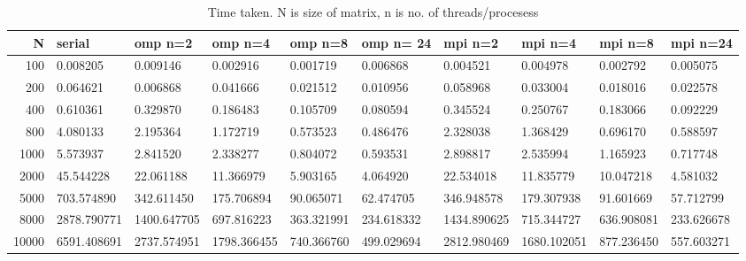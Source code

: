 \documentclass{article}
\begin{document}
\begin{table}[h]

	\begin{center}
		\begin{tabular}{| r | l | l | l | l | l | l | l | l | l |}
			\hline
			N&serial & omp n=2& omp n=4& omp n=8& omp n= 24 & mpi n=2& mpi n=4& mpi n=8& mpi n=24 \\ \hline
			100&0.008205&0.009146&0.002916&0.001719
			&0.006868 & 0.004521 & 0.004978 &0.002792&0.005075\\ \hline
			
			200&0.064621&0.006868&0.041666&	0.021512&0.010956
			&0.058968&0.033004&0.018016&0.022578\\ \hline
		
			400 &0.610361&0.329870&0.186483&0.105709&0.080594 
			&0.345524&0.250767&0.183066&0.092229\\ \hline
		
			800&4.080133&2.195364&1.172719&0.573523&0.486476
			&2.328038&1.368429&0.696170&0.588597\\ \hline
			
			1000&5.573937&2.841520&2.338277&0.804072&0.593531
			&2.898817&2.535994&1.165923&0.717748\\ \hline
			
			2000&45.544228&22.061188&11.366979&5.903165&4.064920
			&22.534018&11.835779&10.047218&4.581032\\ \hline

			5000&703.574890&342.611450&175.706894&90.065071&62.474705
			&346.948578&179.307938&91.601669&57.712799\\ \hline
			
			8000&2878.790771&1400.647705&697.816223&363.321991 
			&234.618332&1434.890625&715.344727&636.908081
			&233.626678 \\ \hline
			
			10000&6591.408691&2737.574951&1798.366455&740.366760 
			&499.029694&2812.980469&1680.102051&877.236450&557.603271\\ 
			\hline
		\end{tabular}
	\end{center}


	\caption{Time taken. N is size of matrix, n is no. of threads/procesess}
\end{table}
\end{document}
